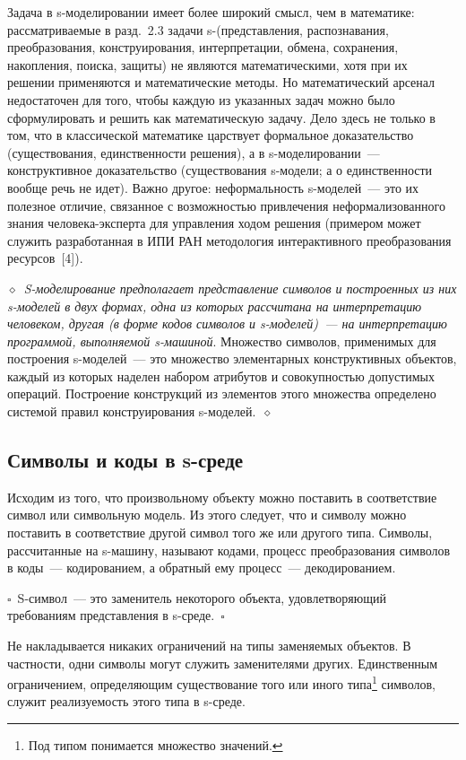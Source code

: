 \begin{multicols}{2}
Задача в s-мо\-де\-ли\-ро\-ва\-нии имеет более широкий смысл, чем в математике:
рассматриваемые в разд.~2.3 задачи s-(пред\-став\-ле\-ния, распознавания,
преобразования, конструирования, интерпретации, обмена, сохранения, накопления, 
поиска, защиты) не являются математическими, хотя при их решении применяются и 
математические методы. Но математический арсенал недостаточен для того, чтобы 
каждую из указанных задач можно было сформулировать и решить как математическую 
задачу. Дело здесь не только в том, что в классической математике царствует 
формальное доказательство (существования, единственности решения), а 
в\linebreak
 s-мо\-де\-ли\-ро\-ва\-нии~--- конструктивное доказательство 
(существования s-мо\-де\-ли; а о единственности вообще речь не идет). Важно 
другое: неформальность s-мо\-де\-лей~--- это их полезное отличие, связанное с 
возможностью привлечения неформализованного знания че\-ло\-ве\-ка-экс\-пер\-та 
для управления ходом решения (примером может служить разработанная в ИПИ РАН 
методология интерактивного преобразования ресурсов~[4]).

\noindent
$\diamond$~\textit{S-моделирование предполагает представление символов и
построенных из них s-моделей в двух формах, одна из которых рассчитана на
интерпретацию человеком, другая (в форме кодов символов
и s-моделей)~--- на
интерпретацию программой, выполняемой s-машиной}. Множество символов,
применимых для построения s-моделей~--- это множество элементарных
конструктивных объектов, каждый из которых наделен набором атрибутов и
совокупностью допустимых операций. Построение конструкций из элементов
этого множества определено системой правил конструирования
s-моделей.~$\diamond$

\subsection{Символы и коды в s-среде} %

Исходим из того, что произвольному объекту можно поставить в
соответствие символ или символьную модель. Из этого следует, что и символу
можно поставить в соответствие другой символ того же или другого типа.
Символы, рассчитанные на s-машину, называют кодами, процесс
преобразования символов в коды~--- кодированием, а обратный ему
процесс~--- декодированием.

\noindent
$\square$~S-символ~--- это заменитель некоторого объекта,
удовлетворяющий требованиям представления в s-среде.~$\square$

Не накладывается никаких ограничений на типы заменяемых объектов. В частности, 
одни символы могут служить заменителями других. Единственным ограничением, 
определяющим существование того или иного типа\footnote{Под типом понимается 
множество значений.} символов, служит реализуемость этого типа в s-среде.


\end{multicols}
